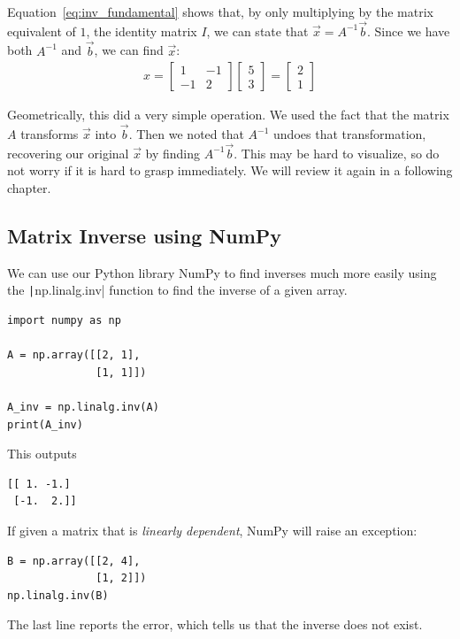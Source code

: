 Equation~\eqref{eq:inv_fundamental} shows that, by only multiplying by the matrix equivalent of $1$, the identity matrix $I$, we can state that $\vec{x}=A^{-1}\vec{b}$.
Since we have both $A^{-1}$ and $\vec{b}$, we can find $\vec{x}$:
$$\begin{array}{c} x =
\begin{bmatrix}
1 & -1 \\
-1 & 2
\end{bmatrix}
\begin{bmatrix}
5 \\
3
\end{bmatrix}
=
\begin{bmatrix}
2 \\
1
\end{bmatrix} \end{array}$$

Geometrically, this did a very simple operation. We used the fact that the matrix $A$ transforms $\vec{x}$ into $\vec{b}$. Then we noted that $A^{-1}$ undoes that transformation, recovering our original $\vec{x}$ by finding $A^{-1} \vec{b}$. 
This may be hard to visualize, so do not worry if it is hard to grasp immediately. We will review it again in a following chapter.
\subsection{Matrix Inverse using NumPy}
We can use our Python library NumPy to find inverses much more easily using the \texttt|np.linalg.inv| function to find the inverse of a given array.
\begin{verbatim}
import numpy as np

A = np.array([[2, 1],
              [1, 1]])

A_inv = np.linalg.inv(A)
print(A_inv)
\end{verbatim}
This outputs
\begin{verbatim}
[[ 1. -1.]
 [-1.  2.]]
\end{verbatim}

If given a matrix that is \emph{linearly dependent}, NumPy will raise an exception:
\begin{verbatim}
B = np.array([[2, 4],
              [1, 2]])
np.linalg.inv(B)
\end{verbatim}
The last line reports the error, which tells us that the inverse does not exist.

